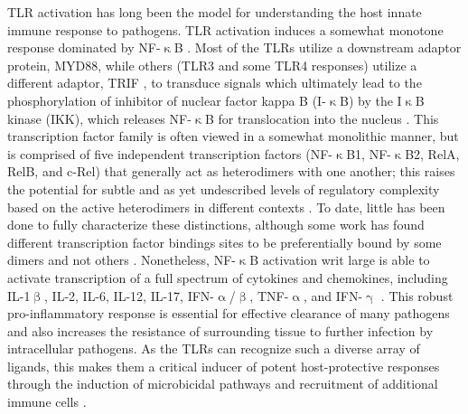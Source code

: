 TLR activation has long been the model for understanding the host innate immune response to pathogens. TLR activation induces a somewhat monotone response dominated by NF\hyp{}$\upkappa$B \citep{Arbibe2000, Kawai2007, Brandt2013, Kawai2009}. Most of the TLRs utilize a downstream adaptor protein, MYD88, while others (TLR3 and some TLR4 responses) utilize a different adaptor, TRIF \citep{Yamamoto2003}, to transduce signals which ultimately lead to the phosphorylation of inhibitor of nuclear factor kappa B (I\hyp{}$\upkappa$B) by the I$\upkappa$B kinase (IKK), which releases NF\hyp{}$\upkappa$B for translocation into the nucleus \citep{Wright1990, Triantafilou2002, Kawai1999, Yamamoto2003, Akira2004, Kawasaki2014, Takeda2004}. This transcription factor family is often viewed in a somewhat monolithic manner, but is comprised of five independent transcription factors (NF\hyp{}$\upkappa$B1, NF\hyp{}$\upkappa$B2, RelA, RelB, and c\hyp{}Rel) that generally act as heterodimers with one another; this raises the potential for subtle and as yet undescribed levels of regulatory complexity based on the active heterodimers in different contexts \citep{Baeuerle1994, Finco1995, Rice1992, Oeckinghaus2009, Ghosh2012, Albensi2019, Liu2017a}. To date, little has been done to fully characterize these distinctions, although some work has found different transcription factor bindings sites to be preferentially bound by some dimers and not others \citep{Siggers2011, Ramsey2019, Florio2022}. Nonetheless, NF\hyp{}$\upkappa$B activation writ large is able to activate transcription of a full spectrum of cytokines and chemokines, including IL\hyp{}1$\upbeta$, IL\hyp{}2, IL\hyp{}6, IL\hyp{}12, IL\hyp{}17, IFN\hyp{}$\upalpha$/$\upbeta$, TNF\hyp{}$\upalpha$, and IFN\hyp{}$\upgamma$ \citep{Pahl1999, Liu2017a, Gilmore2006}. This robust pro\hyp{}inflammatory response is essential for effective clearance of many pathogens and also increases the resistance of surrounding tissue to further infection by intracellular pathogens. As the TLRs can recognize such a diverse array of ligands, this makes them a critical inducer of potent host\hyp{}protective responses through the induction of microbicidal pathways and recruitment of additional immune cells \citep{Kawai2007, Kawasaki2014}. 

